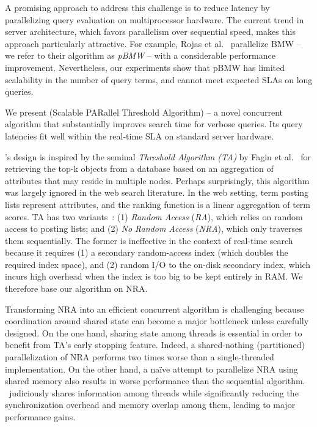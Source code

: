 A promising approach to address this challenge is to reduce latency by
parallelizing query evaluation on multiprocessor hardware. 
The current trend in server architecture, which favors parallelism over sequential speed, makes this approach particularly attractive. 
For example, Rojas et al.~\cite{rojas2013efficient} parallelize BMW -- we refer 
to their  algorithm as \emph{pBMW} -- with a considerable performance improvement.
Nevertheless, our experiments show that pBMW has limited scalability in the number of query terms,
and cannot meet expected SLAs on long queries. 

We present \emph{\alg} (Scalable PARallel Threshold Algorithm) -- a novel 
concurrent algorithm that substantially improves search time for verbose queries. Its
 query latencies fit well within the real-time SLA on standard  server hardware. 

\alg's design is inspired by the seminal \emph{Threshold Algorithm (TA)} by Fagin et al.~\cite{Fagin:2003} for retrieving the top-k objects from a database based on an aggregation of attributes that may reside in multiple nodes. Perhaps surprisingly, this algorithm was largely ignored in the web search literature.
In the web setting, term posting lists represent attributes, and the ranking function is a linear aggregation of term scores. TA has two variants~\cite{Fagin:2003}: (1) \emph{Random Access} ({\em RA}), which  
 relies on random access to  posting lists; 
and (2) \emph{No Random Access} ({\em NRA}), which 
 only traverses them sequentially. The former is ineffective in the context of real-time search 
because it requires (1)  a secondary random-access index (which doubles the required index space), 
and (2) random I/O to the on-disk secondary index, which incurs high overhead when the index  is too big to be 
kept entirely in RAM. We therefore base our algorithm on  NRA. 



Transforming NRA into an efficient concurrent algorithm is challenging because coordination around 
shared state can become a major bottleneck unless carefully designed. On the one hand,
sharing state among threads is essential in order to benefit from TA's early stopping feature.
Indeed, a shared-nothing (partitioned) parallelization of NRA performs two times 
worse than a single-threaded implementation. On the other hand, 
a na\"ive attempt to parallelize NRA using shared memory also results in 
worse performance than the sequential algorithm. \alg\ judiciously shares 
information among threads while significantly reducing the synchronization 
overhead and memory overlap among them, 
leading to major performance gains. 

